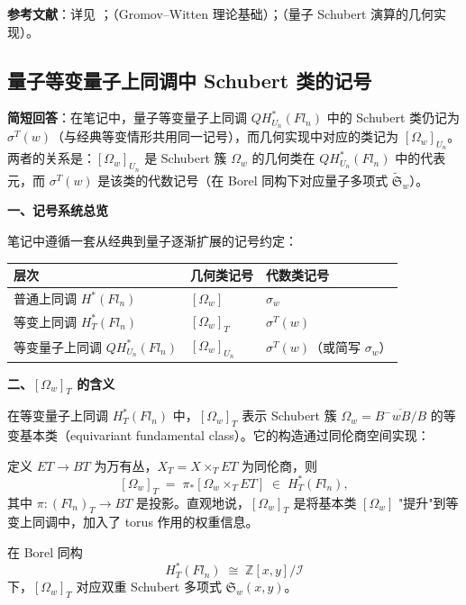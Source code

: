 \textbf{参考文献}：详见 \cite[Section 4]{FultonQuntum1997}；\cite[Section 1]{KontsevichManin1994}（Gromov--Witten 理论基础）；\cite[Section 2]{Buch2003}（量子 Schubert 演算的几何实现）。

\subsection{量子等变量子上同调中 Schubert 类的记号}\label{sec:qa-QuantumSchubertClassNotation}

\textbf{简短回答}：在笔记中，量子等变量子上同调 $QH_{U_n}^*(Fl_n)$ 中的 Schubert 类仍记为 $\sigma^T(w)$（与经典等变情形共用同一记号），而几何实现中对应的类记为 $[\Omega_w]_{U_n}$。两者的关系是：$[\Omega_w]_{U_n}$ 是 Schubert 簇 $\Omega_w$ 的几何类在 $QH_{U_n}^*(Fl_n)$ 中的代表元，而 $\sigma^T(w)$ 是该类的代数记号（在 Borel 同构下对应量子多项式 $\widetilde{\mathfrak{S}}_w$）。

\textbf{一、记号系统总览}

笔记中遵循一套从经典到量子逐渐扩展的记号约定：

\begin{center}
\begin{tabular}{p{3.5cm} | p{5cm} | p{5cm}}
\textbf{层次} & \textbf{几何类记号} & \textbf{代数类记号} \\
\hline
普通上同调 $H^*(Fl_n)$ & $[\Omega_w]$ & $\sigma_w$ \\
等变上同调 $H_T^*(Fl_n)$ & $[\Omega_w]_T$ & $\sigma^T(w)$ \\
等变量子上同调 $QH_{U_n}^*(Fl_n)$ & $[\Omega_w]_{U_n}$ & $\sigma^T(w)$（或简写 $\sigma_w$）\\
\end{tabular}
\end{center}

\textbf{二、$[\Omega_w]_T$ 的含义}

在等变量子上同调 $H_T^*(Fl_n)$ 中，$[\Omega_w]_T$ 表示 Schubert 簇 $\Omega_w = \overline{B^-wB/B}$ 的等变基本类（equivariant fundamental class）。它的构造通过同伦商空间实现：

定义 $ET \to BT$ 为万有丛，$X_T = X \times_T ET$ 为同伦商，则
$$[\Omega_w]_T \;=\; \pi_*[\Omega_w \times_T ET] \;\in\; H_T^*(Fl_n),$$
其中 $\pi: (Fl_n)_T \to BT$ 是投影。直观地说，$[\Omega_w]_T$ 是将基本类 $[\Omega_w]$ "提升"到等变上同调中，加入了 torus 作用的权重信息。

在 Borel 同构
$$H_T^*(Fl_n) \;\cong\; \mathbb{Z}[x,y]/\mathcal{I}$$
下，$[\Omega_w]_T$ 对应双重 Schubert 多项式 $\mathfrak{S}_w(x,y)$。

